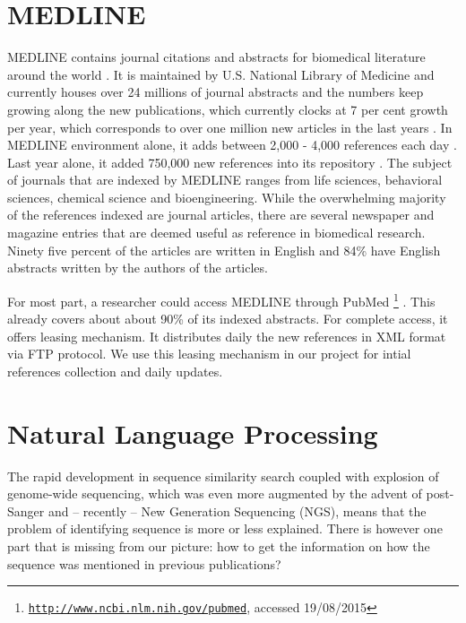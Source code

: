 
\section{MEDLINE}

MEDLINE contains journal citations and abstracts for biomedical literature around the world \citep{MEDLINE}. It is maintained by U.S. National Library of Medicine and currently houses over 24 millions of journal abstracts and the numbers keep growing along the new publications, which currently clocks at 7 per cent growth per year, which corresponds to over one million new articles in the last years \citep{larsen2010rate}. In MEDLINE environment alone, it adds between 2,000 - 4,000 references each day \citep{MEDLINE}. Last year alone, it added 750,000 new references into its repository \citep{MEDLINE}. The subject of journals that are indexed by MEDLINE ranges from life sciences, behavioral sciences, chemical science and bioengineering. While the overwhelming majority of the references indexed are journal articles, there are several newspaper and magazine entries that are deemed useful as reference in biomedical research. Ninety five percent of the articles are written in English and 84\% have English abstracts written by the authors of the articles.

For most part, a researcher could access MEDLINE through PubMed \footnote{\href{http://www.ncbi.nlm.nih.gov/pubmed}{\texttt{http://www.ncbi.nlm.nih.gov/pubmed}}, accessed 19/08/2015} \citep{MELDINEWeb}. This already covers about about 90\% of its indexed abstracts. For complete access, it offers leasing mechanism. It distributes daily the new references in XML format via FTP protocol. We use this leasing mechanism in our project for intial references collection and daily updates.


\section{Natural Language Processing}

The rapid development in sequence similarity search coupled with explosion of genome-wide sequencing, which was even more augmented by the advent of post-Sanger and -- recently -- New Generation Sequencing (NGS), means that the problem of identifying sequence is more or less explained. There is however one part that is missing from our picture: how to get the information on how the sequence was mentioned in previous publications?

